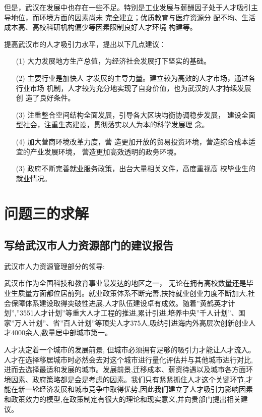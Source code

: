 \documentclass{whutmod}
\begin{document}
	但是，武汉在发展中也存在一些不足。特别是工业发展与薪酬因子处于人才吸引主导地位，而环境方面的因素尚未
	完全建立；优质教育与医疗资源分
	配不均、生活成本高、高校科研机构偏少等因素限制良好人才环境
	构建等。
	
	提高武汉市的人才吸引力水平，提出以下几点建议：
\begin{itemize}
	\item [(1)] 大力发展地方生产总值，为经济社会发展打下坚实的基础。
	\item [(2)]主要行业是加快人
	才发展的主导力量。建立较为高效的人才市场，通过各行业市场
	机制，人才较为充分地实现了自身价值，也为武汉的人才持续发展创
	造了良好条件。
	\item [(3)]注重整合空间结构全面发展，引导各大区块均衡协调稳步发展，
	建设全面型社会，注重生态建设，贯彻落实以人为本的科学发展理
	念。
	\item [(4)]加大营商环境改革力度，营
	造更加开放的贸易投资环境，营造综合成本适宜的产业发展环境，
	营造更加高效透明的政务环境。
	\item [(3)]政府不断完善就业服务政策，出台大量相关文件，高度重视高
	校毕业生的就业情况。
\end{itemize}

	\section{问题三的求解}
	
	
	\subsection{写给武汉市人力资源部门的建议报告}
	
武汉市人力资源管理部分的领导:

武汉市作为全国科技和教育事业最发达的地区之一， 无论在拥有高校数量还是毕业生质量方面都位居前列。就业政策体系不断完善,扶持就业创业力度不断加大,社会保障体系建设取得突破性进展,人才队伍建设卓有成效。随着”黄鹤英才计划”,”3551人才计划”等重大人才工程的推进,累计引进,培养中央”千人计划”、国家”万人计划”、省”百人计划”等顶尖人才375人,吸纳引进海内外高层次创新创业人才4000余人,数量居中部城市第一。

人才决定着一个城市的发展前景, 但城市必须拥有足够的吸引力才能让人才流入。人才在选择移居城市时必然会去对这个城市进行量化评估并与其他城市进行对比, 进而去选择最适和发展的城市。发展前景,迁移成本、薪资待遇以及城市各方面环境因素、政府策略都是会是考虑的因素。我们只有紧紧抓住人才这个关键环节,才能在新一轮经济发展和城市竞争中取得优势,因此我们建立了人才吸引力影响因素和政策效力的模型,在政策制定有很大的理论和现实意义,并向贵部门提出相关建议。
\end{document}
